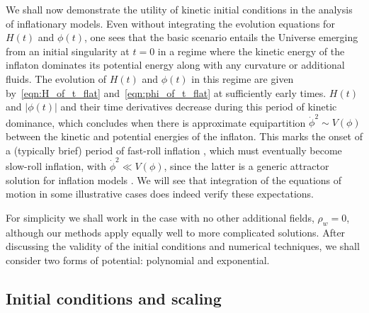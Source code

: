 We shall now demonstrate the utility of kinetic initial conditions in the analysis of inflationary models. Even without integrating the evolution equations for $H(t)$ and $\phi(t)$, one sees that the basic scenario entails the Universe emerging from an initial singularity at $t=0$ in a regime where the kinetic energy of the inflaton dominates its potential energy along with any curvature or additional fluids.  The evolution of $H(t)$ and $\phi(t)$ in this regime are given by~\eqref{eqn:H_of_t_flat} and~\eqref{eqn:phi_of_t_flat} at sufficiently early times.  $H(t)$ and $|\phi(t)|$ and their time derivatives decrease during this period of kinetic dominance, which concludes when there is approximate equipartition $\dot{\phi}^2 \sim V(\phi)$ between the kinetic and potential energies of the inflaton.  This marks the onset of a (typically brief) period of fast-roll inflation \citep{Linde:2001}, which must eventually become slow-roll inflation, with $\dot{\phi}^2 \ll V(\phi)$, since the latter is a generic attractor solution for inflation models \citep{belinsky_inflationary_1985}.  We will see that integration of the equations of motion in some illustrative cases does indeed verify these expectations.

For simplicity we shall work in the case with no other additional fields, $\rho_w=0$, although our methods apply equally well to more complicated solutions. After discussing the validity of the initial conditions and numerical techniques, we shall consider two forms of potential: polynomial and exponential.

\subsection{Initial conditions and scaling}

